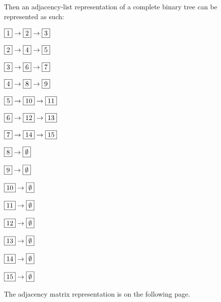 \documentclass[addpoints,11pt]{exam}
\begin{document}
\begin{questions}
\begin{solutionorbox}
    Then an adjacency-list representation of a complete binary tree can be represented as such:
    

    $\fbox{1}\rightarrow\fbox{2}\rightarrow\fbox{3}$
    
    $\fbox{2}\rightarrow\fbox{4}\rightarrow\fbox{5}$
    
    $\fbox{3}\rightarrow\fbox{6}\rightarrow\fbox{7}$
    
    $\fbox{4}\rightarrow\fbox{8}\rightarrow\fbox{9}$
    
    $\fbox{5}\rightarrow\fbox{10}\rightarrow\fbox{11}$
    
    $\fbox{6}\rightarrow\fbox{12}\rightarrow\fbox{13}$
    
    $\fbox{7}\rightarrow\fbox{14}\rightarrow\fbox{15}$
    
    $\fbox{8}\rightarrow\fbox{$\emptyset$}$
    
    $\fbox{9}\rightarrow\fbox{$\emptyset$}$
    
    $\fbox{10}\rightarrow\fbox{$\emptyset$}$
    
    $\fbox{11}\rightarrow\fbox{$\emptyset$}$
    
    $\fbox{12}\rightarrow\fbox{$\emptyset$}$
    
    $\fbox{13}\rightarrow\fbox{$\emptyset$}$
    
    $\fbox{14}\rightarrow\fbox{$\emptyset$}$
    
    $\fbox{15}\rightarrow\fbox{$\emptyset$}$

The adjacency matrix representation is on the following page. 



\end{solutionorbox}
\end{questions}
\end{document}
